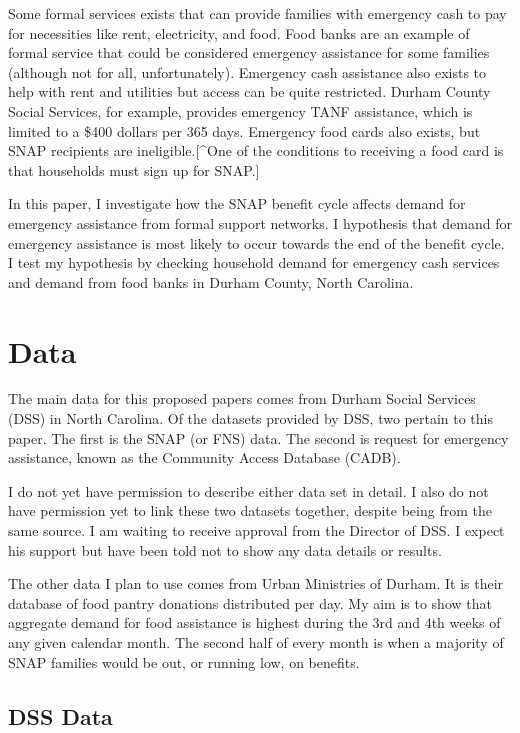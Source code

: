 \documentclass[12pt,letterpaperpaper,]{book}
\begin{document}
Some formal services exists that can provide families with emergency
cash to pay for necessities like rent, electricity, and food. Food banks
are an example of formal service that could be considered emergency
assistance for some families (although not for all, unfortunately).
Emergency cash assistance also exists to help with rent and utilities
but access can be quite restricted. Durham County Social Services, for
example, provides emergency TANF assistance, which is limited to a \$400
dollars per 365 days. Emergency food cards also exists, but SNAP
recipients are ineligible.{[}\^{}One of the conditions to receiving a
food card is that households must sign up for SNAP.{]}

In this paper, I investigate how the SNAP benefit cycle affects demand
for emergency assistance from formal support networks. I hypothesis that
demand for emergency assistance is most likely to occur towards the end
of the benefit cycle. I test my hypothesis by checking household demand
for emergency cash services and demand from food banks in Durham County,
North Carolina.

\section*{Data}\label{data-3}

The main data for this proposed papers comes from Durham Social Services
(DSS) in North Carolina. Of the datasets provided by DSS, two pertain to
this paper. The first is the SNAP (or FNS) data. The second is request
for emergency assistance, known as the Community Access Database (CADB).

I do not yet have permission to describe either data set in detail. I
also do not have permission yet to link these two datasets together,
despite being from the same source. I am waiting to receive approval
from the Director of DSS. I expect his support but have been told not to
show any data details or results.

The other data I plan to use comes from Urban Ministries of Durham. It
is their database of food pantry donations distributed per day. My aim
is to show that aggregate demand for food assistance is highest during
the 3rd and 4th weeks of any given calendar month. The second half of
every month is when a majority of SNAP families would be out, or running
low, on benefits.

\subsection*{DSS Data}\label{dss-data}
\end{document}
